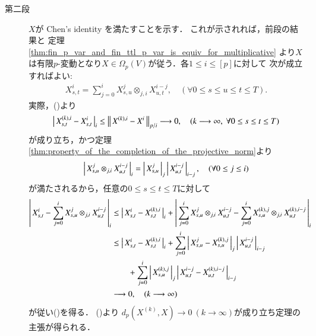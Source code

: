 \begin{prf}
\begin{description}
			\item[第二段] $X$が Chen's identity を満たすことを示す．
			これが示されれば，前段の結果と
			定理\ref{thm:fin_p_var_and_fin_ttl_p_var_is_equiv_for_multiplicative}
			より$X$は有限$p$-変動となり$X \in \Omega_p(V)$が従う．各$1 \leq i \leq [p]$に対して
			次が成立すればよい:
			\begin{align}
				X^i_{s,t} = \sum_{j=0}^i X^j_{s,u} \otimes_{j,i} X^{i-j}_{u,t},
				\quad (\forall 0 \leq s \leq u \leq t \leq T).
				\label{eq:thm_p_rough_path_complete_dist_1}
			\end{align}
			実際，()より
			\begin{align}
				\left|\, X^{(k),i}_{s,t} - X^i_{s,t}\, \right|_{i}
				\leq \left\|\, X^{(k),i} - X^i\, \right\|_{p/i} \longrightarrow 0,
				\quad (k \longrightarrow \infty,\ \forall 0 \leq s \leq t \leq T)
			\end{align}
			が成り立ち，かつ定理\ref{thm:property_of_the_completion_of_the_projective_norm}より
			\begin{align}
				\left|\, X^j_{s,u} \otimes_{j,i} X^{i-j}_{u,t}\, \right|_{i}
				= \left|\, X^j_{s,u}\, \right|_{j} \left|\, X^{i-j}_{u,t}\, \right|_{i-j},
				\quad (\forall 0 \leq j \leq i)
			\end{align}
			が満たされるから，任意の$0 \leq s \leq t \leq T$に対して
			\begin{align}
				\left|\, X^i_{s,t} - \sum_{j=0}^i X^j_{s,u} \otimes_{j,i} X^{i-j}_{u,t}\, \right|_{i}
				&\leq \left|\, X^i_{s,t} - X^{(k),i}_{s,t}\, \right|_{i}
					+ \left|\, \sum_{j=0}^i X^j_{s,u} \otimes_{j,i} X^{i-j}_{u,t} 
					- \sum_{j=0}^i X^{(k),j}_{s,u} \otimes_{j,i} X^{(k),i-j}_{u,t}\, \right|_{i} \\
				&\leq \left|\, X^i_{s,t} - X^{(k),i}_{s,t}\, \right|_{i}
					+ \sum_{j=0}^i \left|\, X^j_{s,u} - X^{(k),j}_{s,u}\, \right|_{j}
						\left|\, X^{i-j}_{u,t}\, \right|_{i-j} \\
					&\qquad + \sum_{j=0}^i \left|\, X^{(k),j}_{s,u}\, \right|_{j}
						\left|\, X^{i-j}_{u,t} - X^{(k),i-j}_{u,t}\, \right|_{i-j} \\
				&\longrightarrow 0,
				\quad (k \longrightarrow \infty)
			\end{align}
			が従い()を得る．
			()より
			$d_p(X^{(k)},X) \longrightarrow 0\ (k \longrightarrow \infty)$が成り立ち定理の主張が得られる．
			\QED
		\end{description}
	\end{prf}
	
	\begin{screen}
		\begin{dfn}[スムースラフパス]
			
		\end{dfn}
	\end{screen}
